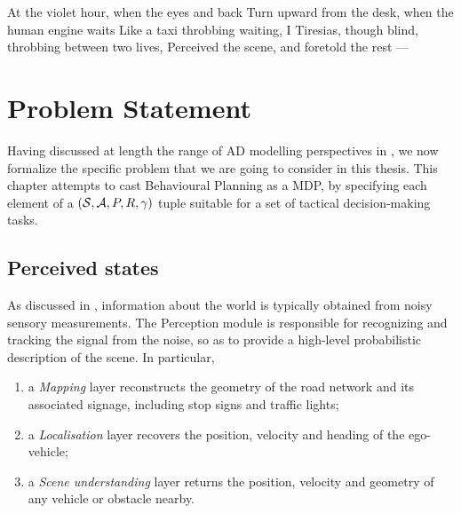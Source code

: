
\graphicspath{{2-Chapters/3-Chapter/}}


At the violet hour, when the eyes and back
Turn upward from the desk, when the human engine waits
Like a taxi throbbing waiting,
I Tiresias, though blind, throbbing between two lives,
Perceived the scene, and foretold the rest —

\chapter{Problem Statement}
\label{chapter:3}


\abstractStartChapter{}%
Having discussed at length the range of \acl*{AD} modelling perspectives in , we now formalize the specific problem that we are going to consider in this thesis. This chapter attempts to cast Behavioural Planning as a \acl*{MDP}, by specifying each element of a $(\mathcal{S}, \mathcal{A}, P, R, \gamma)$ tuple suitable for a set of tactical decision-making tasks.
\minitocStartChapter{}

\section{Perceived states}

As discussed in , information about the world is typically obtained from noisy sensory measurements. The Perception module is responsible for recognizing and tracking the signal from the noise, so as to provide a high-level probabilistic description of the scene. In particular, 
\begin{enumerate}[label=(\roman*)]
	\item a \emph{Mapping} layer reconstructs the geometry of the road network and its associated signage, including stop signs and traffic lights;
	\item a \emph{Localisation} layer recovers the position, velocity and heading of the ego-vehicle;
	\item a \emph{Scene understanding} layer returns the position, velocity and geometry of any vehicle or obstacle nearby.
\end{enumerate}

